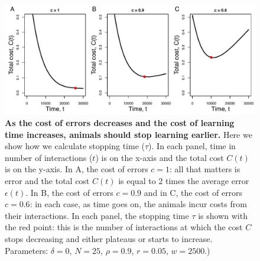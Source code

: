 \begin{figure}[ht]
\includegraphics[width=6.85in]{figures/stopping_time.pdf}
\caption{\sffamily\small\textbf{As the cost of errors decreases and the cost of learning time increases, animals should stop learning earlier.} Here we show how we calculate stopping time ($\tau$). In each panel, time in number of interactions ($t$) is on the x-axis and the total cost $C(t)$ is on the y-axis. In A, the cost of errors $c=1$: all that matters is error and the total cost $C(t)$ is equal to $2$ times the average error $\epsilon(t)$. In B, the cost of errors $c=0.9$ and in C, the cost of errors $c=0.6$: in each case, as time goes on, the animals incur costs from their interactions. In each panel, the stopping time $\tau$ is shown with the red point: this is the number of interactions at which the cost $C$ stops decreasing and either plateaus or starts to increase. Parameters: $\delta=0$, $N=25$, $\rho=0.9$, $r=0.05$, $w=2500$.)
}
\label{tau}
\end{figure}


